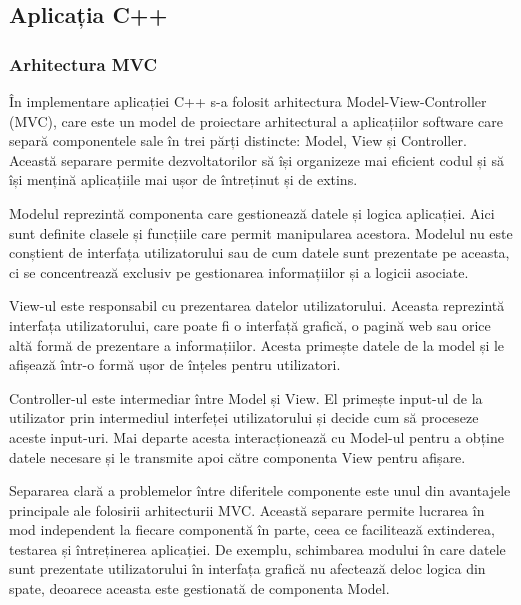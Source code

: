 \documentclass[12pt]{article}
\begin{document}
\subsection{Aplicația C++}

\subsubsection{Arhitectura MVC}

\^{I}n implementare aplicației C++ s-a folosit arhitectura Model-View-Controller (MVC), care este un model de proiectare arhitectural a aplicațiilor software care separ\u{a} componentele sale \^{i}n trei p\u{a}rți distincte: Model, View și Controller. Aceast\u{a} separare permite dezvoltatorilor s\u{a} \^{i}și organizeze mai eficient codul și s\u{a} \^{i}și mențin\u{a} aplicațiile mai ușor de \^{i}ntreținut și de extins.

Modelul reprezint\u{a} componenta care gestioneaz\u{a} datele și logica aplicației. Aici sunt definite clasele și funcțiile care permit manipularea acestora. Modelul nu este conștient de interfața utilizatorului sau de cum datele sunt prezentate pe aceasta, ci se concentreaz\u{a} exclusiv pe gestionarea informațiilor și a logicii asociate.

View-ul este responsabil cu prezentarea datelor utilizatorului. Aceasta reprezint\u{a} interfața utilizatorului, care poate fi o interfaț\u{a} grafic\u{a}, o pagin\u{a} web sau orice alt\u{a} form\u{a} de prezentare a informațiilor. Acesta primește datele de la model și le afișeaz\u{a} \^{i}ntr-o form\u{a} ușor de \^{i}nțeles pentru utilizatori.

Controller-ul este intermediar între Model și View. El primește input-ul de la utilizator prin intermediul interfeței utilizatorului și decide cum s\u{a} proceseze aceste input-uri. Mai departe acesta interacționeaz\u{a} cu Model-ul pentru a obține datele necesare și le transmite apoi către componenta View pentru afișare.

Separarea clar\u{a} a problemelor \^{i}ntre diferitele componente este unul din avantajele principale ale folosirii arhitecturii MVC. Aceast\u{a} separare permite lucrarea \^{i}n mod independent la fiecare component\u{a} \^{i}n parte, ceea ce faciliteaz\u{a} extinderea, testarea și \^{i}ntreținerea aplicației. De exemplu, schimbarea modului \^{i}n care datele sunt prezentate utilizatorului \^{i}n interfața grafic\u{a} nu afecteaz\u{a} deloc logica din spate, deoarece aceasta este gestionat\u{a} de componenta Model.
\end{document}
